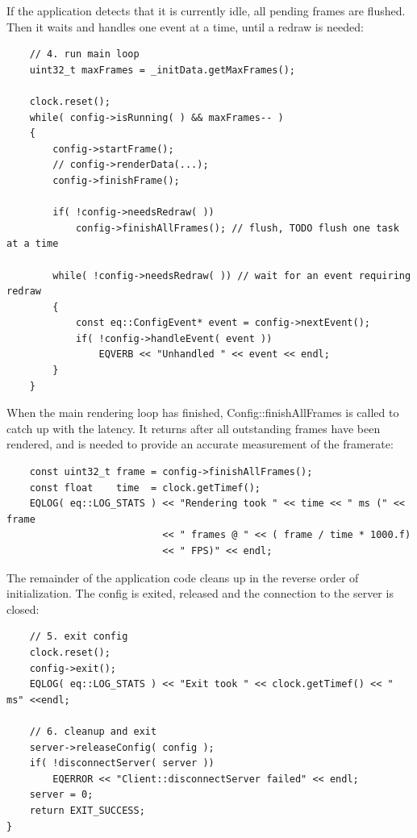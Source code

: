 \documentclass[10pt,a4]{scrartcl}
\begin{document}
If the application detects that it is currently idle, all pending frames
are flushed. Then it waits and handles one event at a time, until a
redraw is needed:

{\footnotesize\begin{lstlisting}
    // 4. run main loop
    uint32_t maxFrames = _initData.getMaxFrames();
    
    clock.reset();
    while( config->isRunning( ) && maxFrames-- )
    {
        config->startFrame();
        // config->renderData(...);
        config->finishFrame();

        if( !config->needsRedraw( ))
            config->finishAllFrames(); // flush, TODO flush one task at a time
            
        while( !config->needsRedraw( )) // wait for an event requiring redraw
        {
            const eq::ConfigEvent* event = config->nextEvent();
            if( !config->handleEvent( event ))
                EQVERB << "Unhandled " << event << endl;
        }
    }
\end{lstlisting}}%

When the main rendering loop has finished,
\textsf{Config::finishAllFrames} is called to catch up with the
latency. It returns after all outstanding frames have been rendered, and
is needed to provide an accurate measurement of the framerate:

{\footnotesize\begin{lstlisting}
    const uint32_t frame = config->finishAllFrames();
    const float    time  = clock.getTimef();
    EQLOG( eq::LOG_STATS ) << "Rendering took " << time << " ms (" << frame
                           << " frames @ " << ( frame / time * 1000.f)
                           << " FPS)" << endl;
\end{lstlisting}}%

The remainder of the application code cleans up in the reverse order of
initialization. The config is exited, released and the connection to
the server is closed:

{\footnotesize\begin{lstlisting}
    // 5. exit config
    clock.reset();
    config->exit();
    EQLOG( eq::LOG_STATS ) << "Exit took " << clock.getTimef() << " ms" <<endl;

    // 6. cleanup and exit
    server->releaseConfig( config );
    if( !disconnectServer( server ))
        EQERROR << "Client::disconnectServer failed" << endl;
    server = 0;
    return EXIT_SUCCESS;
}
\end{lstlisting}}%
\end{document}
